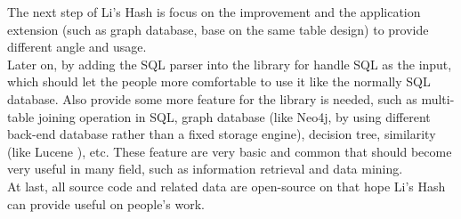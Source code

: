 The next step of Li's Hash is focus on the improvement and the application extension (such as graph database, base on the same table design) to provide different angle and usage.\\

Later on, by adding the SQL parser into the library for handle SQL as the input, which should let the people more comfortable to use it like the normally SQL database. Also provide some more feature for the library is needed, such as multi-table joining operation in SQL, graph database (like Neo4j\cite{web:neo4j:home-page}, by using different back-end database rather than a fixed storage engine), decision tree, similarity (like Lucene \cite{web:wiki:lucene}), etc. These feature are very basic and common that should become very useful in many field, such as information retrieval and data mining.\\

At last, all source code and related data are open-source on \cite{web:lishash:home-page} that hope Li's Hash can provide useful on people's work.\\


